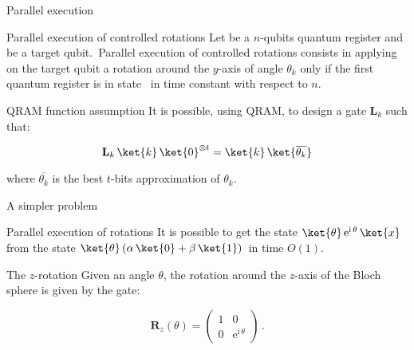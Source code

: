 \documentclass{beamer}
\begin{document}
\begin{frame}{Parallel execution}
    \begin{block}{Parallel execution of controlled rotations}
        Let  be a $n$-qubits quantum register and  be a target qubit.\pause\ Parallel execution of controlled rotations consists in applying on the target qubit a rotation around the $y$-axis of angle $\theta_k$ only if the first quantum register is in state \pause\ in time constant with respect to $n$.
    \end{block}
    
    \pause
    
    \begin{exampleblock}{QRAM function assumption}
        It is possible, using QRAM, to design a gate $\mathbf{L}_k$ such that:
        
        \[\mathbf{L}_k\,\ket{k}\,\ket{0}^{\otimes t} = \ket{k}\,\ket{\overline{\theta_k}}\]
        
        where $\overline{\theta_k}$ is the best $t$-bits approximation of $\theta_k$.
    \end{exampleblock}
\end{frame}

\begin{frame}{A simpler problem}
    \begin{block}{Parallel execution of rotations}
        It is possible to get the state $\ket{\theta}\,\mathrm{e}^{\mathrm{i}\,\theta}\,\ket{x}$ from the state $\ket{\theta}\,(\alpha\,\ket{0}+\beta\,\ket{1})$\pause\ in time $O(1)$.
    \end{block}\pause
    
    \begin{exampleblock}{The $z$-rotation}
        Given an angle $\theta$, the rotation around the $z$-axis of the Bloch sphere is given by the gate:
        
        \[\mathbf{R}_z(\theta)=\begin{pmatrix}1&0\\0&\mathrm{e}^{\mathrm{i}\,\theta}\end{pmatrix}\,.\]
    \end{exampleblock}
\end{frame}
\end{document}
